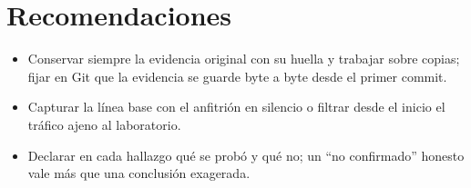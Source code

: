 \section{Recomendaciones}
\begin{itemize}
\item Conservar siempre la evidencia original con su huella y trabajar sobre copias; fijar en Git que la evidencia se guarde byte a byte desde el primer commit.
\item Capturar la línea base con el anfitrión en silencio o filtrar desde el inicio el tráfico ajeno al laboratorio.
\item Declarar en cada hallazgo qué se probó y qué no; un ``no confirmado'' honesto vale más que una conclusión exagerada.
\end{itemize}
